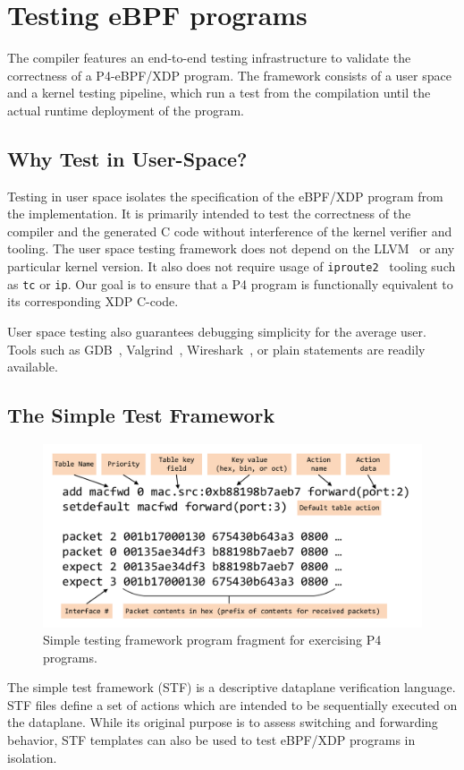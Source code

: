 \section{Testing eBPF programs}\label{sec:testing}
The compiler features an end-to-end testing infrastructure to validate the 
correctness of a P4-eBPF/XDP program. The framework consists of a user space 
and a kernel testing pipeline, which run a test from the compilation 
until the actual runtime deployment of the program.

\subsection{Why Test in User-Space?}
Testing in user space isolates the specification of the eBPF/XDP program from 
the
implementation. It is primarily intended to test the correctness of the
compiler and the generated C code without interference of the kernel verifier
and tooling. The user space testing framework does not depend on the 
LLVM~\cite{llvm} or any particular kernel version. It also does not require 
usage 
of \texttt{iproute2}~\cite{iproute} tooling such as \texttt{tc} or \texttt{ip}. 
Our goal is to ensure that a P4 program is functionally equivalent to its 
corresponding XDP C-code.

User space testing also guarantees debugging simplicity for the average
user. Tools such as GDB~\cite{gdb}, Valgrind~\cite{valgrind}, 
Wireshark~\cite{wireshark}, or plain statements
are readily available.

\subsection{The Simple Test Framework}
\begin{figure}
	\centering
	\includegraphics[width=\linewidth]{stf}
	\caption{Simple testing framework program fragment for exercising P4 programs.}
	\label{fig:stf}
\end{figure}
The simple test framework (STF) is a descriptive dataplane verification 
language. STF files define a set of actions which are intended to be 
sequentially executed on the dataplane.
While its original purpose is to assess switching and forwarding behavior, STF 
templates can also be used to test eBPF/XDP programs in isolation. 

